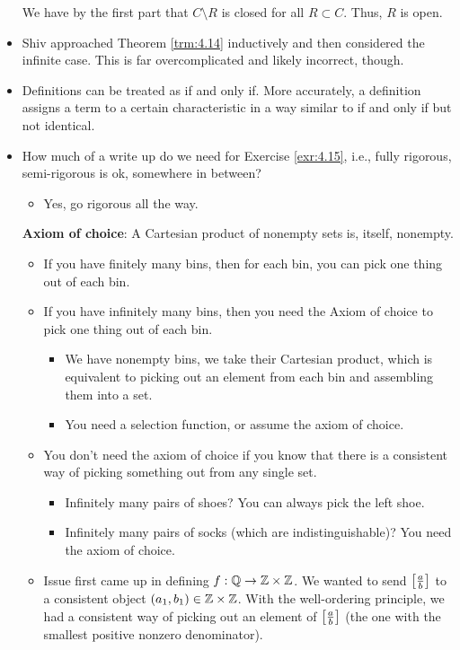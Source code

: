 \documentclass[titlepage]{report}
\begin{document}
\begin{itemize}
    We have by the first part that $C\setminus R$ is closed for all $R\subset C$. Thus, $R$ is open.
    \item Shiv approached Theorem \ref{trm:4.14} inductively and then considered the infinite case. This is far overcomplicated and likely incorrect, though.
    \item Definitions can be treated as if and only if. More accurately, a definition assigns a term to a certain characteristic in a way similar to if and only if but not identical.
    \item {}How much of a write up do we need for Exercise \ref{exr:4.15}, i.e., fully rigorous, semi-rigorous is ok, somewhere in between?
    \begin{itemize}
        \item Yes, go rigorous all the way.
    \end{itemize}
    \textbf{Axiom of choice}: A Cartesian product of nonempty sets is, itself, nonempty.
    \begin{itemize}
        \item If you have finitely many bins, then for each bin, you can pick one thing out of each bin.
        \item If you have infinitely many bins, then you need the Axiom of choice to pick one thing out of each bin.
        \begin{itemize}
            \item We have nonempty bins, we take their Cartesian product, which is equivalent to picking out an element from each bin and assembling them into a set.
            \item You need a selection function, or assume the axiom of choice.
        \end{itemize}
        \item You don't need the axiom of choice if you know that there is a consistent way of picking something out from any single set.
        \begin{itemize}
            \item Infinitely many pairs of shoes? You can always pick the left shoe.
            \item Infinitely many pairs of socks (which are indistinguishable)? You need the axiom of choice.
        \end{itemize}
        \item Issue first came up in defining $f:\mathbb{Q}\to\mathbb{Z}\times\mathbb{Z}$. We wanted to send $\left[ \frac{a}{b} \right]$ to a consistent object $(a_1,b_1)\in\mathbb{Z}\times\mathbb{Z}$. With the well-ordering principle, we had a consistent way of picking out an element of $\left[ \frac{a}{b} \right]$ (the one with the smallest positive nonzero denominator).

\end{itemize}
\end{itemize}
\end{document}
